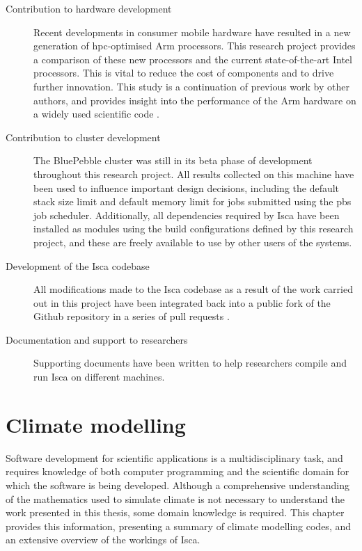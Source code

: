 \documentclass[a4paper,11pt]{report}
\begin{document}
\begin{description}
	\item[Contribution to hardware development] Recent developments in consumer mobile hardware have resulted in a new generation of \gls{hpc}-optimised Arm processors. This research project provides a comparison of these new processors and the current state-of-the-art Intel processors. This is vital to reduce the cost of components and to drive further innovation. This study is a continuation of previous work by other authors, and provides insight into the performance of the Arm hardware on a widely used scientific code \cite{mcintosh2018performance}.
	
	\item[Contribution to cluster development] The BluePebble cluster was still in its beta phase of development throughout this research project. All results collected on this machine have been used to influence important design decisions, including the default stack size limit and default memory limit for jobs submitted using the \gls{pbs} job scheduler. Additionally, all dependencies required by Isca have been installed as modules using the build configurations defined by this research project, and these are freely available to use by other users of the systems. 
	
	\item[Development of the Isca codebase] All modifications made to the Isca codebase as a result of the work carried out in this project have been integrated back into a public fork of the Github repository in a series of pull requests \cite{isca2019github}. 
	
	\item[Documentation and support to researchers] Supporting documents have been written to help researchers compile and run Isca on different machines.
	
\end{description}

\chapter{Climate modelling}
\label{chap:background}
Software development for scientific applications is a multidisciplinary task, and requires knowledge of both computer programming and the scientific domain for which the software is being developed. Although a comprehensive understanding of the mathematics used to simulate climate is not necessary to understand the work presented in this thesis, some domain knowledge is required. This chapter provides this information, presenting a summary of climate modelling codes, and an extensive overview of the workings of Isca.
\end{document}
